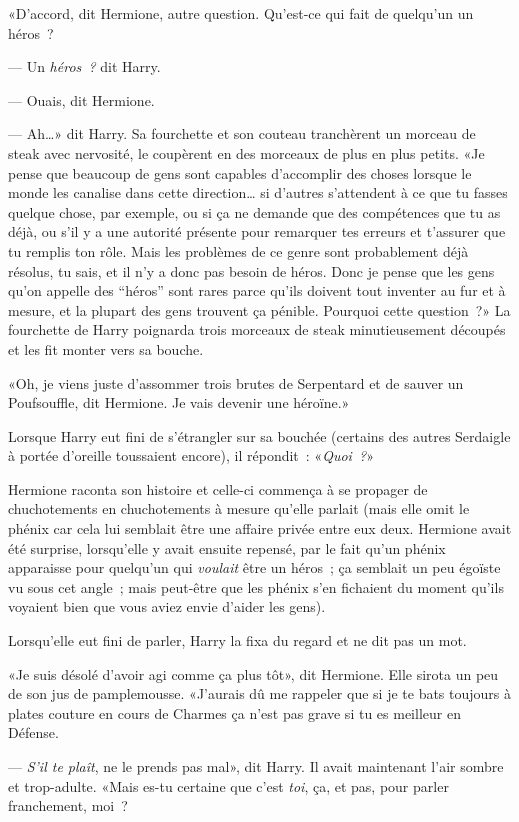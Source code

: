 «D'accord, dit Hermione, autre question. Qu'est-ce qui fait de quelqu'un un héros~?

--- Un \emph{héros~?} dit Harry.

--- Ouais, dit Hermione.

--- Ah…» dit Harry. Sa fourchette et son couteau tranchèrent un morceau de steak avec nervosité, le coupèrent en des morceaux de plus en plus petits. «Je pense que beaucoup de gens sont capables d'accomplir des choses lorsque le monde les canalise dans cette direction… si d'autres s'attendent à ce que tu fasses quelque chose, par exemple, ou si ça ne demande que des compétences que tu as déjà, ou s'il y a une autorité présente pour remarquer tes erreurs et t'assurer que tu remplis ton rôle. Mais les problèmes de ce genre sont probablement déjà résolus, tu sais, et il n'y a donc pas besoin de héros. Donc je pense que les gens qu'on appelle des “héros” sont rares parce qu'ils doivent tout inventer au fur et à mesure, et la plupart des gens trouvent ça pénible. Pourquoi cette question~?» La fourchette de Harry poignarda trois morceaux de steak minutieusement découpés et les fit monter vers sa bouche.

«Oh, je viens juste d'assommer trois brutes de Serpentard et de sauver un Poufsouffle, dit Hermione. Je vais devenir une héroïne.»

Lorsque Harry eut fini de s'étrangler sur sa bouchée (certains des autres Serdaigle à portée d'oreille toussaient encore), il répondit~: «\emph{Quoi~?}»

Hermione raconta son histoire et celle-ci commença à se propager de chuchotements en chuchotements à mesure qu'elle parlait (mais elle omit le phénix car cela lui semblait être une affaire privée entre eux deux. Hermione avait été surprise, lorsqu'elle y avait ensuite repensé, par le fait qu'un phénix apparaisse pour quelqu'un qui \emph{voulait} être un héros~; ça semblait un peu égoïste vu sous cet angle~; mais peut-être que les phénix s'en fichaient du moment qu'ils voyaient bien que vous aviez envie d'aider les gens).

Lorsqu'elle eut fini de parler, Harry la fixa du regard et ne dit pas un mot.

«Je suis désolé d'avoir agi comme ça plus tôt», dit Hermione. Elle sirota un peu de son jus de pamplemousse. «J'aurais dû me rappeler que si je te bats toujours à plates couture en cours de Charmes ça n'est pas grave si tu es meilleur en Défense.

--- \emph{S'il te plaît}, ne le prends pas mal», dit Harry. Il avait maintenant l'air sombre et trop-adulte. «Mais es-tu certaine que c'est \emph{toi}, ça, et pas, pour parler franchement, moi~?

